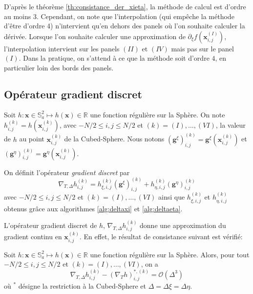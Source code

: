 D'après le théorème \ref{th:consistance_der_xieta}, la méthode de calcul est d'ordre au moins 3. Cependant, on note que l'interpolation (qui empêche la méthode d'être d'ordre 4) n'intervient qu'en dehors des panels où l'on souhaite calculer la dérivée.
Lorsque l'on souhaite calculer une approximation de $\partial_{\xi}f(\mathbf{x}_{i,j}^{(I)})$, l'interpolation intervient sur les panels $(II)$ et $(IV)$ mais pas sur le panel $(I)$. Dans la pratique, on s'attend à ce que la méthode soit d'ordre $4$, en particulier loin des bords des panels.



\subsection{Opérateur gradient discret}

Soit $h : \mathbf{x} \in \mathbb{S}_a^2 \mapsto h(\mathbf{x}) \in \mathbb{R}$ une fonction régulière sur la Sphère. On note $h_{i,j}^{(k)} = h(\mathbf{x}_{i,j}^{(k)})$, avec $-N/2 \leq i,j \leq N/2$ et $(k) = (I) , \ldots , (VI)$, la valeur de $h$ au point $\mathbf{x}_{i,j}^{(k)}$ de la Cubed-Sphere.
Nous notons $( \mathbf{g}^{\xi} )_{i,j}^{(k)} = \mathbf{g}^{\xi} (\mathbf{x}_{i,j}^{(k)})$ et $( \mathbf{g}^{\eta} )_{i,j}^{(k)} = \mathbf{g}^{\eta} (\mathbf{x}_{i,j}^{(k)})$.

\begin{definition}
On définit l'opérateur \textit{gradient discret} par 
\begin{equation}
\nabla_{T,\Delta} h_{i,j}^{(k)} = h_{\xi,i,j}^{(k)} ( \mathbf{g}^{\xi} )_{i,j}^{(k)} + h_{\eta,i,j}^{(k)} ( \mathbf{g}^{\eta} )_{i,j}^{(k)}
\end{equation}
avec $-N/2 \leq i,j \leq N/2$ et $(k) = (I), \ldots , (VI)$ ainsi que $h_{\xi,i,j}^{(k)}$ et $h_{\eta,i,j}^{(k)}$ obtenus grâce aux algorithmes \ref{alg:deltaxi} et \ref{alg:deltaeta}.
\end{definition}
L'opérateur gradient discret de $h$, $\nabla_{T,\Delta} h_{i,j}^{(k)}$ donne une approximation du gradient continu en $\mathbf{x}_{i,j}^{(k)}$. En effet, le résultat de consistance suivant est vérifié:

\begin{proposition}
Soit $h : \mathbf{x} \in \mathbb{S}_a^2 \mapsto h(\mathbf{x}) \in \mathbb{R}$ une fonction régulière sur la Sphère. Alors, pour tout $-N/2 \leq i,j \leq N/2$ et $(k)=(I), \ldots , (VI)$, on a
\begin{equation}
\nabla_{T,\Delta} h_{i,j}^{(k)} - (\nabla_T h)^{*,(k)}_{i,j} = \mathcal{O} \left( \Delta^3 \right)
\end{equation}
où $^*$ désigne la restriction à la Cubed-Sphere et $\Delta = \Delta \xi = \Delta \eta$. 
\label{prop:accuracy_gradient}
\end{proposition}

